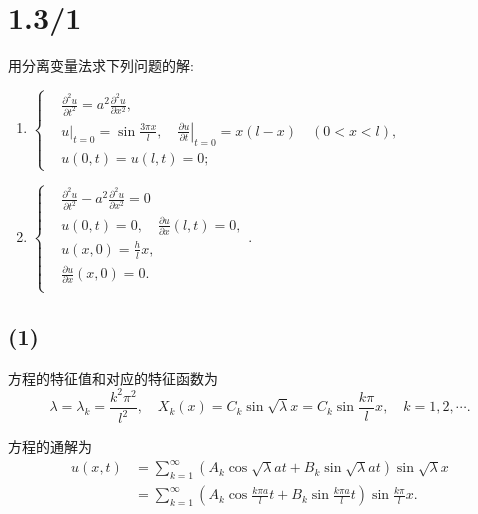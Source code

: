 \documentclass[11pt,a4paper]{article}
\author{刘逸灏 (515370910207)}
\begin{document}
\maketitle

\section{1.3/1}

\begin{problem}
用分离变量法求下列问题的解:
\begin{enumerate}
  \item $
          \left\{\begin{aligned}
             & \frac{\partial^2u}{\partial t^2}=a^2\frac{\partial^2u}{\partial x^2},                                      \\
             & u|_{t=0}=\sin\frac{3\pi x}{l},\quad \left.\frac{\partial u}{\partial t}\right|_{t=0}=x(l-x) \quad (0<x<l), \\
             & u(0,t)=u(l,t)=0;
          \end{aligned}\right.
        $
  \item $
          \left\{\begin{aligned}
             & \frac{\partial^2u}{\partial t^2}-a^2\frac{\partial^2u}{\partial x^2}=0 \\
             & u(0,t)=0,\quad \frac{\partial u}{\partial x}(l,t)=0,                   \\
             & u(x,0)=\frac{h}{l}x,                                                   \\
             & \frac{\partial u}{\partial x}(x,0)=0.                                  \\
          \end{aligned}\right..
        $
\end{enumerate}
\end{problem}

\subsection*{(1)}

方程的特征值和对应的特征函数为
$$\lambda=\lambda_k=\frac{k^2\pi^2}{l^2},\quad X_k(x)=C_k\sin\sqrt{\lambda}x=C_k\sin\frac{k\pi}{l}x,\quad k=1,2,\cdots.$$

方程的通解为
\begin{align*}
  u(x,t)
   & =\sum_{k=1}^\infty\left(A_k\cos\sqrt{\lambda}at+
  B_k\sin\sqrt{\lambda}at\right)\sin\sqrt{\lambda}x    \\
   & =\sum_{k=1}^\infty\left(A_k\cos\frac{k\pi a}{l}t+
  B_k\sin\frac{k\pi a}{l}t\right)\sin\frac{k\pi}{l}x.
\end{align*}
\end{document}
